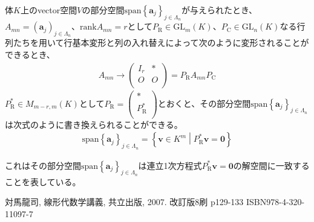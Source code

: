 \documentclass[dvipdfmx]{jsarticle}
\begin{document}
\begin{thm*}
  体$K$上のvector空間$V$の部分空間${\mathrm{span} }\left\{ \mathbf{a}_{j} \right\}_{j \in \varLambda_{n}}$が与えられたとき、$A_{mn} = \left( \mathbf{a}_{j} \right)_{j \in \varLambda_{n}}$、${\mathrm{rank}}A_{mn} = r$として$P_{\mathrm{R}} \in {\mathrm{GL}}_{m}(K)$、$P_{\mathrm{C}} \in {\mathrm{GL}}_{n}(K)$なる行列たちを用いて行基本変形と列の入れ替えによって次のように変形されることができるとき、
  \begin{align*}
  A_{mn} \rightarrow \begin{pmatrix}
  I_{r} & * \\
  O & O \\
  \end{pmatrix} = P_{\mathrm{R}}A_{mn}P_{\mathrm{C}}
  \end{align*}
  $P_{\mathrm{R}}^{*} \in M_{m - r,m}(K)$として$P_{\mathrm{R}} = \begin{pmatrix}
  * \\
  P_{\mathrm{R}}^{*} \\
  \end{pmatrix}$とおくと、その部分空間${\mathrm{span} }\left\{ \mathbf{a}_{j} \right\}_{j \in \varLambda_{n}}$は次式のように書き換えられることができる。
  \begin{align*}
  {\mathrm{span} }\left\{ \mathbf{a}_{j} \right\}_{j \in \varLambda_{n}} = \left\{ \mathbf{v} \in K^{m} \middle| P_{\mathrm{R}}^{*}\mathbf{v} = \mathbf{0} \right\}
  \end{align*}
\end{thm*}\par
これはその部分空間${\mathrm{span}}\left\{ \mathbf{a}_{j} \right\}_{j \in \varLambda_{n}}$は連立1次方程式$P_{\mathrm{R}}^{*}\mathbf{v} = \mathbf{0}$の解空間に一致することを表している。
\begin{thebibliography}{50}
    対馬龍司, 線形代数学講義, 共立出版, 2007. 改訂版8刷 p129-133 ISBN978-4-320-11097-7
\end{thebibliography}
\end{document}
